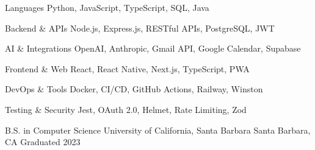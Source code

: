 \documentclass[12pt, letterpaper]{russell}
\begin{document}
\begin{minipage}[t]{0.48\textwidth}
\begin{cvskills}
  \cvskill
    {Languages} %
    {Python, JavaScript, TypeScript, SQL, Java} %

  \cvskill
    {Backend \& APIs} %
    {Node.js, Express.js, RESTful APIs, PostgreSQL, JWT} %

  \cvskill
    {AI \& Integrations} %
    {OpenAI, Anthropic, Gmail API, Google Calendar, Supabase} %
\end{cvskills}
\end{minipage}
\hfill
\begin{minipage}[t]{0.48\textwidth}
\begin{cvskills}
  \cvskill
    {Frontend \& Web} %
    {React, React Native, Next.js, TypeScript, PWA} %

  \cvskill
    {DevOps \& Tools} %
    {Docker, CI/CD, GitHub Actions, Railway, Winston} %

  \cvskill
    {Testing \& Security} %
    {Jest, OAuth 2.0, Helmet, Rate Limiting, Zod} %
\end{cvskills}
\end{minipage}
\vspace{-0.3cm}

\vspace{-0.2cm}

\begin{cventries}

  \cventry
    {B.S. in Computer Science} %
    {University of California, Santa Barbara} %
    {Santa Barbara, CA} %
    {Graduated 2023} %
    { }


\end{cventries}
\end{document}
